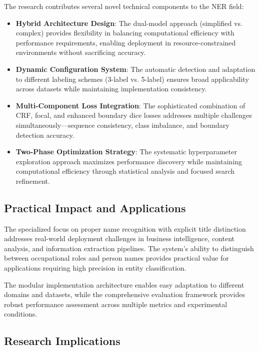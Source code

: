 \documentclass[a4paper]{usiinfbachelorproject}
\begin{document}
The research contributes several novel technical components to the NER field:

\begin{itemize}
    \item \textbf{Hybrid Architecture Design}: The dual-model approach (simplified vs. complex) provides flexibility in balancing computational efficiency with performance requirements, enabling deployment in resource-constrained environments without sacrificing accuracy.
    
    \item \textbf{Dynamic Configuration System}: The automatic detection and adaptation to different labeling schemes (3-label vs. 5-label) ensures broad applicability across datasets while maintaining implementation consistency.
    
    \item \textbf{Multi-Component Loss Integration}: The sophisticated combination of CRF, focal, and enhanced boundary dice losses addresses multiple challenges simultaneously—sequence consistency, class imbalance, and boundary detection accuracy.
    
    \item \textbf{Two-Phase Optimization Strategy}: The systematic hyperparameter exploration approach maximizes performance discovery while maintaining computational efficiency through statistical analysis and focused search refinement.
\end{itemize}

\subsection{Practical Impact and Applications}

The specialized focus on proper name recognition with explicit title distinction addresses real-world deployment challenges in business intelligence, content analysis, and information extraction pipelines. The system's ability to distinguish between occupational roles and person names provides practical value for applications requiring high precision in entity classification.

The modular implementation architecture enables easy adaptation to different domains and datasets, while the comprehensive evaluation framework provides robust performance assessment across multiple metrics and experimental conditions.

\subsection{Research Implications}
\end{document}
